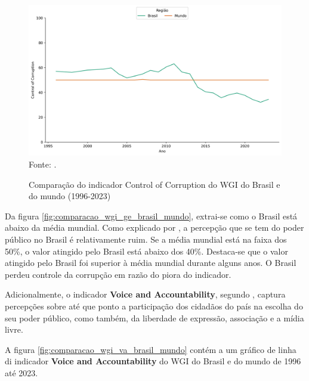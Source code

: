 \begin{figure}[H]
	\centering
	\caption{Comparação do indicador Control of Corruption do WGI do Brasil e do mundo (1996-2023)}
	\includegraphics[width=1\linewidth]{figuras/comparacao_wgi_cc_brasil_mundo}
	\label{fig:comparacao_wgi_cc_brasil_mundo}
	\footnotesize{Fonte: \cite{wgi_dados}.}
\end{figure}

Da figura \ref{fig:comparacao_wgi_ge_brasil_mundo}, extrai-se como o Brasil está abaixo da média mundial. Como explicado por \cite{kaufmann2024worldwide}, a percepção que se tem do poder público no Brasil é relativamente ruim. Se a média mundial está na faixa dos 50\%, o valor atingido pelo Brasil está abaixo dos 40\%. Destaca-se que o valor atingido pelo Brasil foi superior à média mundial durante alguns anos. O Brasil perdeu controle da corrupção em razão do piora do indicador.

Adicionalmente, o indicador \textbf{Voice and Accountability}, segundo  \cite{kaufmann2024worldwide}, captura percepções sobre até que ponto a participação dos cidadãos do país na escolha do seu poder público, como também, da liberdade de expressão, associação e a mídia livre.

A figura \ref{fig:comparacao_wgi_va_brasil_mundo} contém a um gráfico de linha di indicador \textbf{Voice and Accountability} do WGI do Brasil e do mundo de 1996 até 2023.

